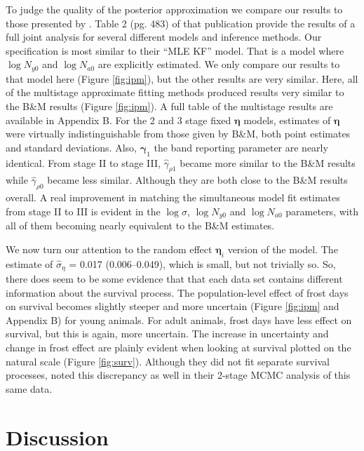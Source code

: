 \documentclass[12pt]{article}
\newcommand{\bn}{\boldsymbol{\eta}}
\newcommand{\bg}{\boldsymbol{\gamma}}
\begin{document}
To judge the quality of the posterior approximation we compare our results to those presented by \cite{besbeas2019exact}. Table 2 (pg. 483) of that publication provide the results of a full joint analysis for several different models and inference methods. Our specification is most similar to their ``MLE KF'' model. That is a model where $\log N_{y0}$ and $\log N_{a0}$ are explicitly estimated.  We only compare our results to that model here (Figure \ref{fig:ipm}), but the other results are very similar. Here, all of the multistage approximate fitting methods produced results very similar to  the B\&M results (Figure \ref{fig:ipm}). A full table of the multistage results are available in Appendix B. For the 2 and 3 stage fixed $\bn$ models, estimates of $\bn$ were virtually indistinguishable from those given by B\&M, both point estimates and standard deviations. Also, $\bg_1$ the band reporting parameter are nearly identical. From stage II to stage III, $\hat{\gamma}_{\rho 1}$ became more similar to the B\&M results while $\hat{\gamma}_{\rho 0}$ became less similar. Although they are both close to the B\&M results overall. A real improvement in matching the simultaneous model fit estimates from stage II to III is evident in the $\log \sigma$, $\log N_{y0}$ and $\log N_{a0}$ parameters, with all of them becoming nearly equivalent to the B\&M estimates.  

We now turn our attention to the random effect $\bn_i$ version of the model. The estimate of $\hat{\sigma}_\eta$ = 0.017 (0.006--0.049), which is small, but not trivially so. So, there does seem to be some evidence that that each data set contains different information about the survival process. The population-level effect of frost days on survival becomes slightly steeper and more uncertain (Figure \ref{fig:ipm} and Appendix B) for young animals. For adult animals, frost days have less effect on survival, but this is again, more uncertain. The increase in uncertainty and change in frost effect are plainly evident when looking at survival plotted on the natural scale (Figure \ref{fig:surv}). Although they did not fit separate survival processes, \citet{goudie2019joining} noted this discrepancy as well in their 2-stage MCMC analysis of this same data.          


\section{Discussion}
\end{document}
